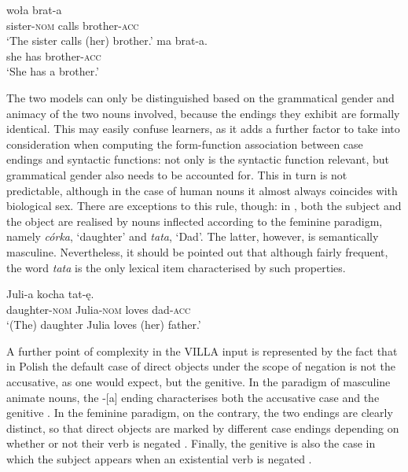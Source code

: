 \ea%
    \label{ex:08:4}
    \ea\label{ex:08:4a}
       {woła}   {brat-a} \\
            sister-\textsc{nom} calls   brother-\textsc{acc}\\
    \glt    ‘The sister calls (her) brother.’
    \ex\label{ex:08:4b}
       {ma}   {brat-a.}\\
            she  has  brother-\textsc{acc}\\
    \glt    ‘She has a brother.’
    \glt   
    \z
\z

The two models can only be distinguished based on the grammatical gender and animacy of the two nouns involved, because the endings they exhibit are formally identical. This may easily confuse learners, as it adds a further factor to take into consideration when computing the form-function association between case endings and syntactic functions: not only is the syntactic function relevant, but grammatical gender also needs to be accounted for. This in turn is not predictable, although in the case of human nouns it almost always coincides with biological sex. There are exceptions to this rule, though: in , both the subject and the object are realised by nouns inflected according to the feminine paradigm, namely \textit{córka}, ‘daughter’ and \textit{tata}, ‘Dad’. The latter, however, is semantically masculine. Nevertheless, it should be pointed out that although fairly frequent, the word \textit{tata} is the only lexical item characterised by such properties.

\ea%
    \label{ex:08:5}
         {Juli-a}     {kocha} {tat-ę.}\\
            daughter-\textsc{nom}  Julia-\textsc{nom}  loves  dad-\textsc{acc}\\
    \glt    ‘(The) daughter Julia loves (her) father.’
    \z

A further point of complexity in the VILLA input is represented by the fact that in Polish the default case of direct objects under the scope of negation is not the accusative, as one would expect, but the genitive. In the paradigm of masculine animate nouns, the -[a] ending characterises both the accusative case and the genitive . In the feminine paradigm, on the contrary, the two endings are clearly distinct, so that direct objects are marked by different case endings depending on whether or not their verb is negated . Finally, the genitive is also the case in which the subject appears when an existential verb is negated .

